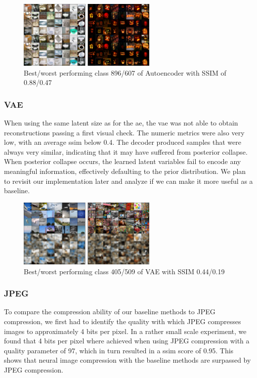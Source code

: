 \begin{figure}[H]
    \centering
    \includegraphics[width=0.6\textwidth]{images/ae_minmax}
    \caption{Best/worst performing class 896/607 of Autoencoder with SSIM of 0.88/0.47}
    \label{fig:imnet_best_perf_ae}
\end{figure}

\subsubsection{VAE}
When using the same latent size as for the \ac{ae}, the \ac{vae} was not able to obtain reconstructions
passing a first visual check.
The numeric metrics were also very low, with an average \ac{ssim} below 0.4.
The decoder produced samples that were always very similar, indicating that it may have suffered from posterior
collapse.
When posterior collapse occurs, the learned latent variables fail to encode any meaningful information, effectively
defaulting to the prior distribution.
We plan to revisit our implementation later and analyze if we can make it more useful as a baseline.

\begin{figure}[H]
    \centering
    \includegraphics[width=0.6\textwidth]{images/vae_minmax}
    \caption{Best/worst performing class 405/509 of VAE with SSIM 0.44/0.19}
    \label{fig:imnet_best_perf2_vae}
\end{figure}

\subsubsection{JPEG}\label{subsubsec:jpeg}
To compare the compression ability of our baseline methods to JPEG compression, we first had to identify the quality with which JPEG compresses images to approximately 4 bits per pixel.
In a rather small scale experiment, we found that 4 bits per pixel where achieved when using JPEG compression with a quality parameter of 97, which in turn resulted in a \ac{ssim} score of 0.95.
This shows that neural image compression with the baseline methods are surpassed by JPEG compression.

